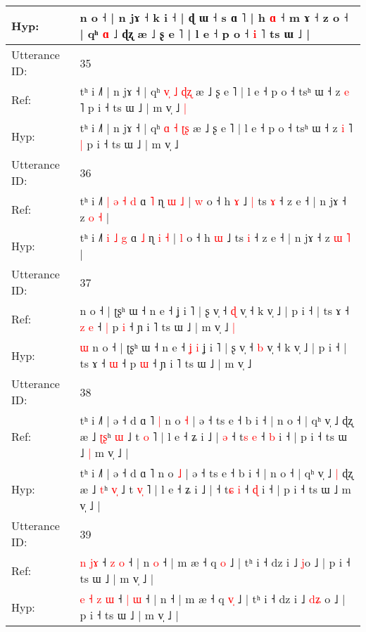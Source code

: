 \documentclass[10pt]{article}
\DeclareRobustCommand{\hl}[1]{{\textcolor{red}{#1}}}
\begin{document}
\begin{longtable}{ll}
Hyp: & n o ˧ | n jɤ ˧ k i ˧ | ɖ ɯ ˧ s ɑ ˥ | h \hl{}\hl{ɑ} ˧ m ɤ ˧ z o ˧ | qʰ \hl{}\hl{ɑ} ˩ ɖʐ æ ˩ ʂ e ˥ | l e ˧ p o ˧ \hl{}\hl{i} ˥ ts ɯ ˩ |
 \\
\midrule
Utterance ID: & 35 \\
Ref: & tʰ i ˩˥ | n jɤ ˧ | qʰ \hl{v}\hl{̩} \hl{˩} \hl{ɖ}\hl{ʐ} æ ˩ ʂ e ˥ | l e ˧ p o ˧ tsʰ ɯ ˧ z \hl{e} ˥\hl{}\hl{} p i ˧ ts ɯ ˩ | m v̩ ˩\hl{ }\hl{|}
 \\
Hyp: & tʰ i ˩˥ | n jɤ ˧ | qʰ \hl{}\hl{ɑ} \hl{˧} \hl{ʈ}\hl{ʂ} æ ˩ ʂ e ˥ | l e ˧ p o ˧ tsʰ ɯ ˧ z \hl{i} ˥\hl{ }\hl{|} p i ˧ ts ɯ ˩ | m v̩ ˩\hl{}\hl{}
 \\
\midrule
Utterance ID: & 36 \\
Ref: & tʰ i ˩˥\hl{ }\hl{|} \hl{ə} \hl{˧} \hl{d} ɑ \hl{˥} ɳ \hl{ɯ} \hl{˩} | \hl{w} o ˧ h \hl{ɤ} ˩\hl{ }\hl{|} ts \hl{ɤ} ˧ z e ˧ | n jɤ ˧ z \hl{o} \hl{˧} |
 \\
Hyp: & tʰ i ˩˥\hl{}\hl{} \hl{i} \hl{˩} \hl{g} ɑ \hl{˩} ɳ \hl{i} \hl{˧} | \hl{l} o ˧ h \hl{ɯ} ˩\hl{}\hl{} ts \hl{i} ˧ z e ˧ | n jɤ ˧ z \hl{ɯ} \hl{˥} |
 \\
\midrule
Utterance ID: & 37 \\
Ref: & \hl{}\hl{}n o ˧ | ʈʂʰ ɯ ˧ n e ˧\hl{}\hl{}\hl{}\hl{} ʝ i ˥ | ʂ v̩ ˧ \hl{ɖ} v̩ ˧ k v̩ ˩ | p i ˧ | ts ɤ ˧\hl{ }\hl{z} \hl{e} ˧\hl{ }\hl{|} p \hl{i} ˧ ɲ i ˥ ts ɯ ˩ | m v̩ ˩\hl{ }\hl{|}
 \\
Hyp: & \hl{ɯ}\hl{ }n o ˧ | ʈʂʰ ɯ ˧ n e ˧\hl{ }\hl{ʝ}\hl{ }\hl{i} ʝ i ˥ | ʂ v̩ ˧ \hl{b} v̩ ˧ k v̩ ˩ | p i ˧ | ts ɤ ˧\hl{}\hl{} \hl{ɯ} ˧\hl{}\hl{} p \hl{ɯ} ˧ ɲ i ˥ ts ɯ ˩ | m v̩ ˩\hl{}\hl{}
 \\
\midrule
Utterance ID: & 38 \\
Ref: & tʰ i ˩˥ | ə ˧ d ɑ ˥\hl{ }\hl{|} n o \hl{˧} | ə ˧ ts e ˧ b i ˧ | n o ˧ | qʰ v̩ ˩\hl{}\hl{} ɖʐ æ ˩ \hl{ʈ}\hl{ʂ}ʰ \hl{}\hl{ɯ} ˩ t \hl{}\hl{o} ˥ | l e ˧ ʑ i ˩ |\hl{ }\hl{ə} ˧ t\hl{s} \hl{e} ˧ \hl{b} i ˧ | p i ˧ ts ɯ ˩\hl{ }\hl{|} m v̩ ˩ |
 \\
Hyp: & tʰ i ˩˥ | ə ˧ d ɑ ˥\hl{}\hl{} n o \hl{˩} | ə ˧ ts e ˧ b i ˧ | n o ˧ | qʰ v̩ ˩\hl{ }\hl{|} ɖʐ æ ˩ \hl{}\hl{t}ʰ \hl{v}\hl{̩} ˩ t \hl{v}\hl{̩} ˥ | l e ˧ ʑ i ˩ |\hl{}\hl{} ˧ t\hl{ɕ} \hl{i} ˧ \hl{ɖ} i ˧ | p i ˧ ts ɯ ˩\hl{}\hl{} m v̩ ˩ |
 \\
\midrule
Utterance ID: & 39 \\
Ref: & \hl{}\hl{}\hl{n} \hl{}\hl{j}\hl{ɤ} ˧ \hl{z} \hl{o} ˧ | n\hl{ }\hl{o} ˧ | m æ ˧ q \hl{}\hl{o} ˩ | tʰ i ˧ dz i ˩ \hl{}\hl{}\hl{j}o ˩ | p i ˧ ts ɯ ˩ | m v̩ ˩ |
 \\
Hyp: & \hl{e}\hl{ }\hl{˧} \hl{z}\hl{ }\hl{ɯ} ˧ \hl{|} \hl{ɯ} ˧ | n\hl{}\hl{} ˧ | m æ ˧ q \hl{v}\hl{̩} ˩ | tʰ i ˧ dz i ˩ \hl{d}\hl{ʑ}\hl{ }o ˩ | p i ˧ ts ɯ ˩ | m v̩ ˩ |

\end{longtable}
\end{document}
